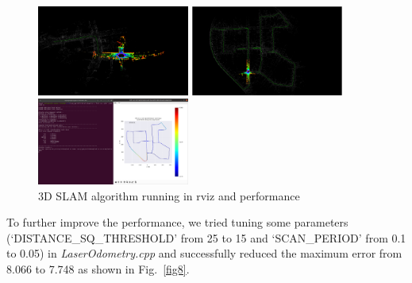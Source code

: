 \documentclass[hyperref]{article}
\theoremstyle{nonumberplain}
\begin{document}
\begin{figure}[H]
	\centering
	\begin{minipage}[t]{0.32\textwidth}
		\centering
		\includegraphics[width=5cm]{3.1b_rviz_middle.png}
	\end{minipage}
	\begin{minipage}[t]{0.32\textwidth}
		\centering
		\includegraphics[width=5cm]{3.1b_rviz_final.png}
	\end{minipage}
	\begin{minipage}[t]{0.32\textwidth}
		\centering
		\includegraphics[width=5cm]{3.1b_result.png}
	\end{minipage}
	\caption{3D SLAM algorithm running in rviz and performance}
	\label{fig7}
\end{figure} 

To further improve the performance, we tried tuning some parameters (‘DISTANCE\_SQ\_THRESHOLD’ from 25 to 15 and ‘SCAN\_PERIOD’ from 0.1 to 0.05) in \textit{LaserOdometry.cpp} and successfully reduced the maximum error from 8.066 to 7.748 as shown in Fig.~\ref{fig8}.
\end{document}
